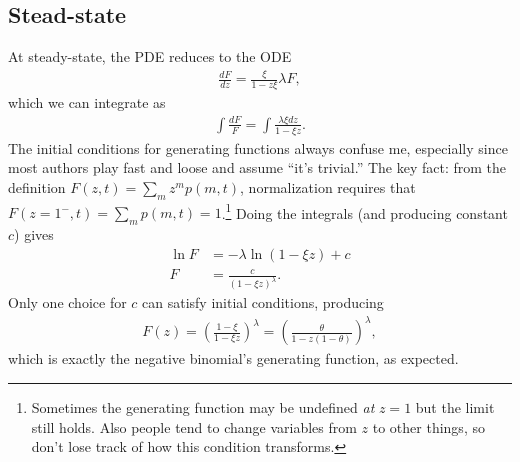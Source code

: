 \documentclass[12pt]{article}%
\newcommand{\deriv}[2][{}]{\frac{d #1}{d #2}}
\begin{document}
\subsection{Stead-state}
At steady-state, the PDE reduces to the ODE
\begin{align}
\deriv[F]{z} = \frac{\xi}{1-z\xi}\lambda F,
\end{align}
which we can integrate as
\begin{align}
\int \frac{dF}{F} = \int \frac{\lambda\xi dz}{1-\xi z}.
\end{align}
The initial conditions for generating functions always confuse me,
especially since most authors play fast and loose and assume ``it's
trivial.'' The key fact: from the definition
$F(z,t) = \sum_m z^m p(m,t)$,
normalization requires that
$F(z=1^-,t) = \sum_m p(m,t) = 1$.\footnote{
Sometimes the generating function may be undefined \textit{at} $z=1$ but the
limit still holds. Also people tend to change variables from $z$ to other
things, so don't lose track of how this condition transforms.
}
Doing the integrals (and producing constant $c$) gives
\begin{align}
\ln F &= -\lambda \ln(1-\xi z) + c
\\
F &= \frac{c}{(1-\xi z)^\lambda}.
\end{align}
Only one choice for $c$ can satisfy initial conditions, producing
\begin{align}
F(z) = \left(\frac{1-\xi}{1-\xi z}\right)^\lambda
        = \left(\frac{\theta}{1 - z(1-\theta)}\right)^\lambda,
\end{align}
which is exactly the negative binomial's generating function, as expected.
\end{document}
